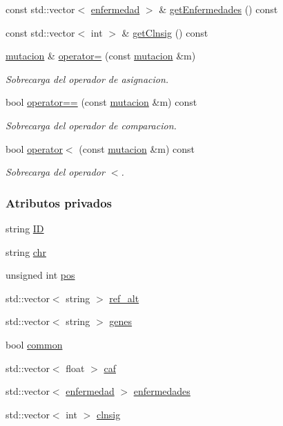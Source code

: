 \begin{DoxyCompactItemize}
\item 
const std\-::vector$<$ \hyperlink{classenfermedad}{enfermedad} $>$ \& \hyperlink{classmutacion_aacfdae8cf04968fdc8fa803c8e5adb81}{get\-Enfermedades} () const 
\item 
const std\-::vector$<$ int $>$ \& \hyperlink{classmutacion_aa59e921d4a64cf1be5cd4d99076234ee}{get\-Clnsig} () const 
\item 
\hyperlink{classmutacion}{mutacion} \& \hyperlink{classmutacion_aa38c36e397000cbef22a5933f56d59ed}{operator=} (const \hyperlink{classmutacion}{mutacion} \&m)
\begin{DoxyCompactList}\small\item\em Sobrecarga del operador de asignacion. \end{DoxyCompactList}\item 
bool \hyperlink{classmutacion_a2e36c20aeff8c7cc88abe84efe0b11be}{operator==} (const \hyperlink{classmutacion}{mutacion} \&m) const 
\begin{DoxyCompactList}\small\item\em Sobrecarga del operador de comparacion. \end{DoxyCompactList}\item 
bool \hyperlink{classmutacion_a0ccb4444b7afd120dc4557fd05f9ca27}{operator$<$} (const \hyperlink{classmutacion}{mutacion} \&m) const 
\begin{DoxyCompactList}\small\item\em Sobrecarga del operador $<$. \end{DoxyCompactList}\end{DoxyCompactItemize}
\subsubsection*{Atributos privados}
\begin{DoxyCompactItemize}
\item 
string \hyperlink{classmutacion_aafc39218473e0f21eb0c3dc05dd4f35e}{I\-D}
\item 
string \hyperlink{classmutacion_a57651966b952f782240ff9cff72c5d2f}{chr}
\item 
unsigned int \hyperlink{classmutacion_ae1487b8648d0eaad68de5e4e5a87f3ff}{pos}
\item 
std\-::vector$<$ string $>$ \hyperlink{classmutacion_a2b3d0ed7547618562fae965d373b39e3}{ref\-\_\-alt}
\item 
std\-::vector$<$ string $>$ \hyperlink{classmutacion_af0048945b6062d6eb88b91db707993f6}{genes}
\item 
bool \hyperlink{classmutacion_a6dabfef6167d64030f095887b15f65dd}{common}
\item 
std\-::vector$<$ float $>$ \hyperlink{classmutacion_aef3fe46b6a2d10e3993703ebd5d5be5f}{caf}
\item 
std\-::vector$<$ \hyperlink{classenfermedad}{enfermedad} $>$ \hyperlink{classmutacion_ac8cca92dea1ab6fb9c193eed55a5ad28}{enfermedades}
\item 
std\-::vector$<$ int $>$ \hyperlink{classmutacion_a0d029eee6925649df15081b780c12e37}{clnsig}
\end{DoxyCompactItemize}


